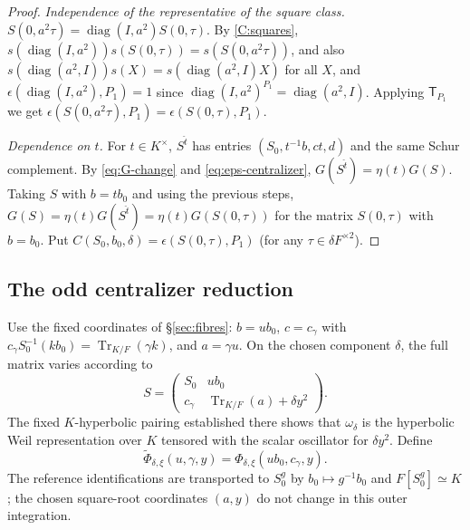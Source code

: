 \documentclass[11pt,oneside,notitlepage]{book}
\numberwithin{equation}{section}
\theoremstyle{plain}
\theoremstyle{definition}
\newcommand{\Tr}{\operatorname{Tr}}
\newcommand{\diag}{\operatorname{diag}}
\newcommand{\T}{\mathsf{T}}
\begin{document}
\begin{proof}
	\emph{Independence of the representative of the square class.} $S(0,a^2\tau )=\diag(I,a^2)S(0,\tau )$. By \ref{C:squares}, $s(\diag(I,a^2))s(S(0,\tau ))=s(S(0,a^2\tau ))$, and also $s(\diag(a^2,I))s(X)=s(\diag(a^2,I)X)$ for all $X$, and $\epsilon(\diag(I,a^2),P_1)=1$ since $\diag(I,a^2)^{P_1}=\diag(a^2,I)$. Applying $\T_{P_1}$ we get $\epsilon(S(0,a^2\tau ),P_1)=\epsilon(S(0,\tau ),P_1)$.
	
	\emph{Dependence on $t$.} For $t\in K^\times$, $S^{\hat t}$ has entries $(S_0,t^{-1}b,ct,d)$ and the same Schur complement. By \eqref{eq:G-change} and \eqref{eq:eps-centralizer}, $G(S^{\hat t})=\eta(t)G(S)$. Taking $S$ with $b=tb_0$ and using the previous steps, $G(S)=\eta(t)G(S^{\hat t})=\eta(t)G(S(0,\tau ))$ for the matrix $S(0,\tau )$ with $b=b_0$. Put $C(S_0,b_0,\delta)=\epsilon(S(0,\tau ),P_1)$ (for any $\tau \in\delta F^{\times2}$).
\end{proof}

\subsection*{The odd centralizer reduction}
Use the fixed coordinates of \S\ref{sec:fibres}: $b=ub_0$, $c=c_\gamma$ with $c_\gamma S_0^{-1}(kb_0)=\Tr_{K/F}(\gamma k)$, and $a=\gamma u$. On the chosen component $\delta$, the full matrix varies according to
\[
S=\begin{pmatrix}S_0&ub_0\\c_\gamma&\Tr_{K/F}(a)+\delta y^2\end{pmatrix}.
\]
The fixed $K$-hyperbolic pairing established there shows that $\omega_\delta$ is the hyperbolic Weil representation over $K$ tensored with the scalar oscillator for $\delta y^2$. Define
\[
\tilde\Phi_{\delta,\xi}(u,\gamma,y)
=\Phi_{\delta,\xi}(ub_0,c_\gamma,y).
\]
The reference identifications are transported to $S_0^g$ by $b_0\mapsto g^{-1}b_0$ and $F[S_0^g]\simeq K$; the chosen square-root coordinates $(a,y)$ do not change in this outer integration.
\end{document}
